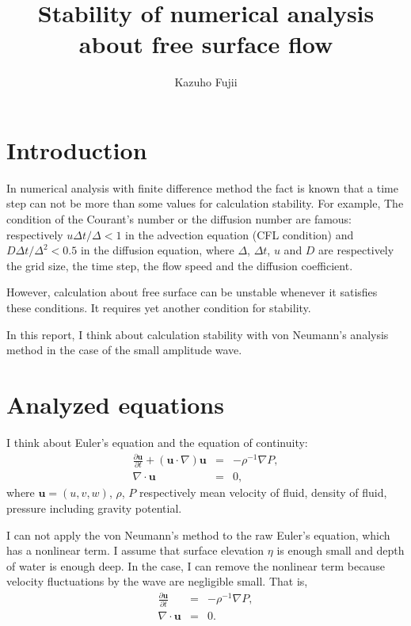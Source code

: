 \documentclass[a4paper,11pt]{article}
\title{Stability of numerical analysis about free surface flow}
\author{Kazuho Fujii}
\date{}
\begin{document}
\maketitle

\section{Introduction}
In numerical analysis with finite difference method the fact is known
that a time step can not be more than some values for calculation
stability. For example, The condition of the Courant's number or the
diffusion number are famous: respectively $u\Delta t/\Delta < 1$ in
the advection equation (CFL condition) and $D\Delta t/\Delta^2 <
0.5$ in the diffusion equation, where $\Delta$, $\Delta t$, $u$ and $D$
are respectively the grid size, the time step, the flow speed and the
diffusion coefficient.

However, calculation about free surface can be unstable whenever it satisfies these conditions. It requires yet another condition for stability.

In this report, I think about calculation stability with von Neumann's analysis method in the case of the small amplitude wave.

\section{Analyzed equations}

I think about Euler's equation and the equation of continuity:
\begin{eqnarray}
\frac{\partial \bm{u}}{\partial t}
 + (\bm{u} \cdot \nabla)\bm{u}
&=& - \rho^{-1}\nabla P, \\
\nabla \cdot \bm{u} &=& 0,
\end{eqnarray}
where $\bm{u}=(u,v,w)$, $\rho$, $P$ respectively mean velocity of fluid, density of fluid, pressure including gravity potential.

I can not apply the von Neumann’s method to the raw Euler’s equation,
which has a nonlinear term. I assume that surface elevation $\eta$ is
enough small and depth of water is enough deep. In the case, I can
remove the nonlinear term because velocity fluctuations by the wave are
negligible small. That is,
\begin{eqnarray}
\frac{\partial \bm{u}}{\partial t}
&=& - \rho^{-1}\nabla P, \label{linear-euler}\\
\nabla \cdot \bm{u} &=& 0.
\end{eqnarray}
\end{document}

